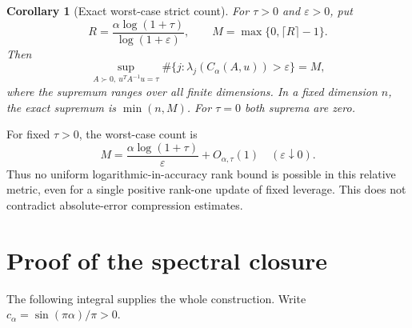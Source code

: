 \documentclass[11pt]{article}
\newtheorem{corollary}[theorem]{Corollary}
\begin{document}
\begin{corollary}[Exact worst-case strict count]\label{cor:count}
For $\tau>0$ and $\varepsilon>0$, put
\[
 R=\frac{\alpha\log(1+\tau)}{\log(1+\varepsilon)},\qquad
 M=\max\{0,\lceil R\rceil-1\}.
\]
Then
\[
 \sup_{A\succ0,\ u^TA^{-1}u=\tau}
 \#\{j:\lambda_j(C_\alpha(A,u))>\varepsilon\}=M,
\]
where the supremum ranges over all finite dimensions.
In a fixed dimension $n$, the exact supremum is $\min(n,M)$.
For $\tau=0$ both suprema are zero.
\end{corollary}

For fixed $\tau>0$, the worst-case count is
\[
 M=\frac{\alpha\log(1+\tau)}{\varepsilon}+O_{\alpha,\tau}(1)
 \quad(\varepsilon\downarrow0).
\]
Thus no uniform logarithmic-in-accuracy rank bound is possible in this
relative metric, even for a single positive rank-one update of fixed
leverage. This does not contradict absolute-error compression estimates.

\section{Proof of the spectral closure}
The following integral supplies the whole construction.
Write $c_\alpha=\sin(\pi\alpha)/\pi>0$.
\end{document}
